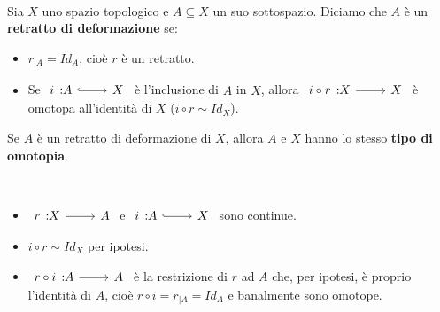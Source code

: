\begin{define}~{}\\
	Sia $X$ uno spazio topologico e $A\subseteq X$ un suo sottospazio. Diciamo che $A$ è un \textbf{retratto di deformazione} se:
		\begin{itemize}
			\item $r_{\mid A}=Id_A$, cioè $r$ è un retratto.
			\item Se $\incl{i}{A}{X}$ è l'inclusione di $A$ in $X$, allora $\funz{i\circ r}{X}{X}$ è omotopa all'identità di $X$ ($i\circ r\sim Id_X$).
		\end{itemize}
	\vspace{-3mm}
\end{define}
\begin{observe}
	Se $A$ è un retratto di deformazione di $X$, allora $A$ e $X$ hanno lo stesso \textbf{tipo di omotopia}.
\end{observe}
\begin{demonstration}~{}
	\begin{itemize}
		\item $\funz{r}{X}{A}$ e $\incl{i}{A}{X}$ sono continue.
		\item $i\circ r\sim Id_X$ per ipotesi.
		\item $\funz{r\circ i}{A}{A}$ è la restrizione di $r$ ad $A$ che, per ipotesi, è proprio l'identità di $A$, cioè $r\circ i=r_{\mid A}=Id_A$ e banalmente sono omotope.
	\end{itemize}
\vspace{-3mm}
\end{demonstration}
